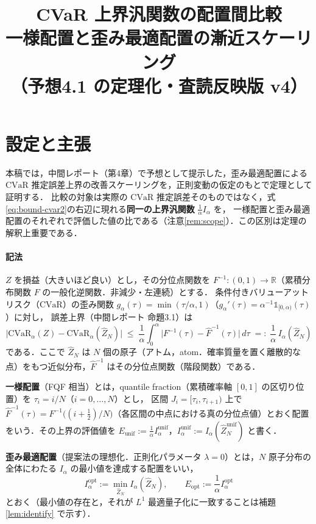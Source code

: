 \documentclass[a4paper,10pt]{jsarticle}
\title{CVaR 上界汎関数の配置間比較\\
  一様配置と歪み最適配置の漸近スケーリング\\
  （予想4.1 の定理化・査読反映版 v4）}
\author{}
\date{}
\theoremstyle{definition}
\newcommand{\CVaR}{\mathrm{CVaR}}
\newcommand{\Finv}{F^{-1}}
\newcommand{\Fhinv}{\hat{F}^{-1}}
\newcommand{\R}{\mathbb{R}}
\newcommand{\Eunif}{E_{\mathrm{unif}}}
\newcommand{\Eopt}{E_{\mathrm{opt}}}
\newcommand{\Iunif}{I_\alpha^{\mathrm{unif}}}
\newcommand{\Iopt}{I_\alpha^{\mathrm{opt}}}
\begin{document}
\maketitle

\section{設定と主張}
\label{sec:setting}

本稿では，中間レポート（第4章）で予想として提示した，歪み最適配置による $\CVaR$ 推定誤差上界の改善スケーリングを，正則変動の仮定のもとで定理として証明する．
比較の対象は実際の $\CVaR$ 推定誤差そのものではなく，式\eqref{eq:bound-cvar2}の右辺に現れる\textbf{同一の上界汎関数} $\frac1\alpha I_\alpha$ を，
一様配置と歪み最適配置のそれぞれで評価した値の比である（注意\ref{rem:scope}）．この区別は定理の解釈上重要である．

\paragraph{記法}
$Z$ を損益（大きいほど良い）とし，その分位点関数を $\Finv\colon(0,1)\to\R$（累積分布関数 $F$ の一般化逆関数．非減少・左連続）とする．
条件付きバリューアットリスク（$\CVaR$）の歪み関数 $g_\alpha(\tau)=\min(\tau/\alpha,1)$（$g_\alpha'(\tau)=\alpha^{-1}\mathbb{1}_{[0,\alpha)}(\tau)$）に対し，
誤差上界（中間レポート 命題3.1）は
\begin{equation}
  \bigl|\CVaR_\alpha(Z)-\CVaR_\alpha(\hat Z_N)\bigr|
  \;\le\;\frac1\alpha\int_0^\alpha\bigl|\Finv(\tau)-\Fhinv(\tau)\bigr|\,d\tau
  \;=:\;\frac1\alpha\,I_\alpha(\hat Z_N)
  \label{eq:bound-cvar2}
\end{equation}
である．ここで $\hat Z_N$ は $N$ 個の原子（アトム，atom．確率質量を置く離散的な点）をもつ近似分布，$\Fhinv$ はその分位点関数（階段関数）である．

\textbf{一様配置}（FQF 相当）とは，quantile fraction（累積確率軸 $[0,1]$ の区切り位置）を $\tau_i=i/N$（$i=0,\dots,N$）とし，
区間 $J_i=[\tau_i,\tau_{i+1})$ 上で $\Fhinv(\tau)=\Finv\bigl((i+\tfrac12)/N\bigr)$（各区間の中点における真の分位点値）とおく配置をいう．その上界の評価値を
$\Eunif:=\frac1\alpha\Iunif$，$\Iunif:=I_\alpha(\hat Z_N^{\mathrm{unif}})$ と書く．

\textbf{歪み最適配置}（提案法の理想化．正則化パラメータ $\lambda=0$）とは，$N$ 原子分布の全体にわたる $I_\alpha$ の最小値を達成する配置をいい，
\begin{equation}
  \Iopt:=\min_{\hat Z_N}I_\alpha(\hat Z_N),\qquad \Eopt:=\frac1\alpha\Iopt
  \label{eq:def-opt}
\end{equation}
とおく（最小値の存在と，それが $L^1$ 最適量子化に一致することは補題\ref{lem:identify} で示す）．
\end{document}
